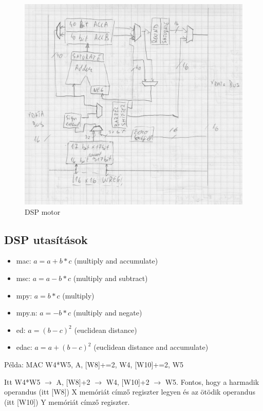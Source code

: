 \begin{figure}[H]
    \centering
    \includegraphics[scale=0.15]{figures/dsp_engine.jpg}
    \caption{DSP motor}
\end{figure}

\subsection{DSP utasítások}

\begin{itemize}
    \item mac: $a = a + b * c$ (multiply and accumulate)
    \item msc: $a = a - b * c$ (multiply and subtract)
    \item mpy: $a = b * c$ (multiply)
    \item mpy.n: $a = - b * c$ (multiply and negate)
    \item ed: $a = (b - c) ^ 2$ (euclidean distance)
    \item edac: $a = a + (b - c) ^ 2$ (euclidean distance and accumulate)
\end{itemize}

Példa: MAC W4*W5, A, [W8]+=2, W4, [W10]+=2, W5

Itt W4*W5 $\rightarrow$ A, [W8]+2 $\rightarrow$ W4, [W10]+2 $\rightarrow$ W5. Fontos, hogy a harmadik operandus (itt [W8]) X memóriát címző regiszter legyen és az ötödik operandus (itt [W10]) Y memóriát címző regiszter.

